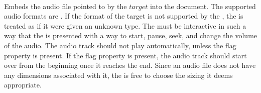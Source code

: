  \\

Embeds the audio file pointed to by the \inline$target$ into the document. The supported audio formats are . If the format of the target is not supported by the , the  is treated as if it were given an unknown type. The  must be interactive in such a way that the  is presented with a way to start, pause, seek, and change the volume of the audio. The audio track should not play automatically, unless the  flag property is present. If the  flag property is present, the audio track should start over from the beginning once it reaches the end. Since an audio file does not have any dimensions associated with it, the  is free to choose the sizing it deems appropriate. \\

\begin{examples}
\end{examples}
